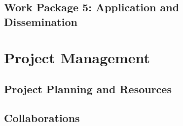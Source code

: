 \documentclass{llncs}
\begin{document}
\subsection{Work Package 5: Application and Dissemination}
\label{sec:wp5} 
 

\section{Project Management}

\subsection{Project Planning and Resources} 
\label{sec:planning}
 

\subsection{Collaborations}
\label{sec:collaborations}
 




% 
\end{document}
